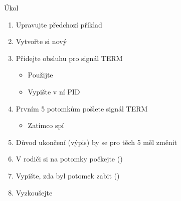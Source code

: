 \begin{frame}{Úkol}

  \begin{enumerate}
    \ifpcdirlinux
      \item Upravujte předchozí příklad
    \else
      \item Vytvořte si nový 
    \fi

    \item Přidejte obsluhu pro signál TERM
    \begin{itemize}
      \item Použijte 
      \item Vypište v ní PID
    \end{itemize}

     \fi

    \item Prvním 5 potomkům pošlete signál TERM
    \begin{itemize}
      \item Zatímco spí
    \end{itemize}

    \ifpcdirlinux
      \item Důvod ukončení (výpis) by se pro těch 5 měl změnit
    \else
      \item V rodiči si na potomky počkejte ()
      \item Vypište, zda byl potomek zabit ()
    \fi

    \item Vyzkoušejte
  \end{enumerate}

\end{frame}

